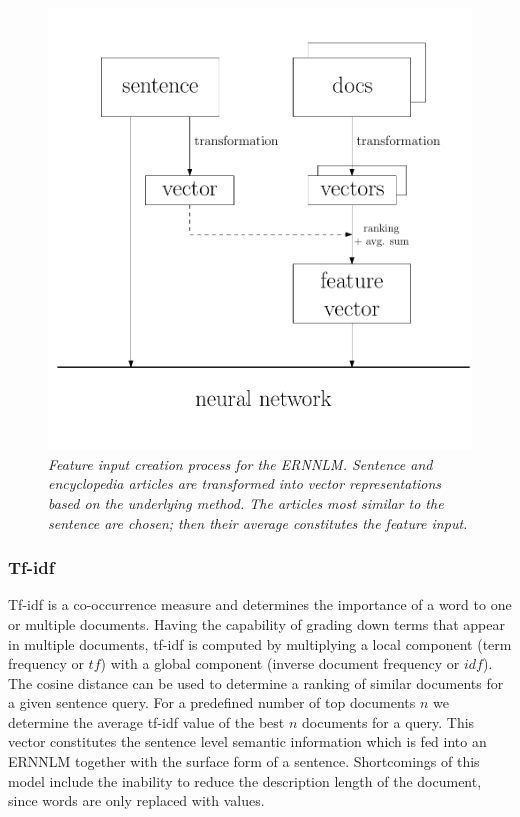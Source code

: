\documentclass[a4paper]{article}
\begin{document}
\begin{figure} 
\centering 
\includegraphics[width=\columnwidth]{flow.pdf}
\caption{\it Feature input creation process for the ERNNLM. Sentence and encyclopedia articles are transformed into vector representations based on the underlying method. The articles most similar to the sentence are chosen; then their average constitutes the feature input.}
\label{fig:flow}
\end{figure}

\subsubsection{Tf-idf}
Tf-idf \cite{salton1986introduction} is a co-occurrence measure and determines the importance of a word to one or multiple documents. Having the capability of grading down terms that appear in multiple documents, tf-idf is computed by multiplying a local component (term frequency or $tf$) with a global component (inverse document frequency or $idf$).
The cosine distance can be used to determine a ranking of similar documents for a given sentence query.
For a predefined number of top documents $n$ we determine the average tf-idf value of the best $n$ documents for a query.
This vector constitutes the sentence level semantic information which is fed into an ERNNLM together with the surface form of a sentence.
Shortcomings of this model include the inability to reduce the description length of the document, since words are only replaced with values.
\end{document}
